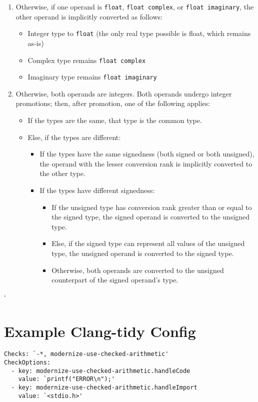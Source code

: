 \begin{enumerate}
    \item Otherwise, if one operand is \texttt{float}, \texttt{float complex}, or \texttt{float imaginary}, the other operand is implicitly converted as follows:
    \begin{itemize}
        \item Integer type to \texttt{float} (the only real type possible is float, which remains as-is)
        \item Complex type remains \texttt{float complex}
        \item Imaginary type remains \texttt{float imaginary}
    \end{itemize}

    \item Otherwise, both operands are integers. Both operands undergo integer promotions; then, after promotion, one of the following applies:
    \begin{itemize}
        \item If the types are the same, that type is the common type.
        \item Else, if the types are different:
        \begin{itemize}
            \item If the types have the same signedness (both signed or both unsigned), the operand with the lesser conversion rank is implicitly converted to the other type.
            \item If the types have different signedness:
            \begin{itemize}
                \item If the unsigned type has conversion rank greater than or equal to the signed type, the signed operand is converted to the unsigned type.
                \item Else, if the signed type can represent all values of the unsigned type, the unsigned operand is converted to the signed type.
                \item Otherwise, both operands are converted to the unsigned counterpart of the signed operand's type.
            \end{itemize}
        \end{itemize}
    \end{itemize}
\end{enumerate}`

\chapter{Example Clang-tidy Config}
\label{appendix:config}
\begin{verbatim}
Checks: `-*, modernize-use-checked-arithmetic'
CheckOptions:
  - key: modernize-use-checked-arithmetic.handleCode
    value: `printf("ERROR\n");'
  - key: modernize-use-checked-arithmetic.handleImport
    value: `<stdio.h>'
\end{verbatim}

